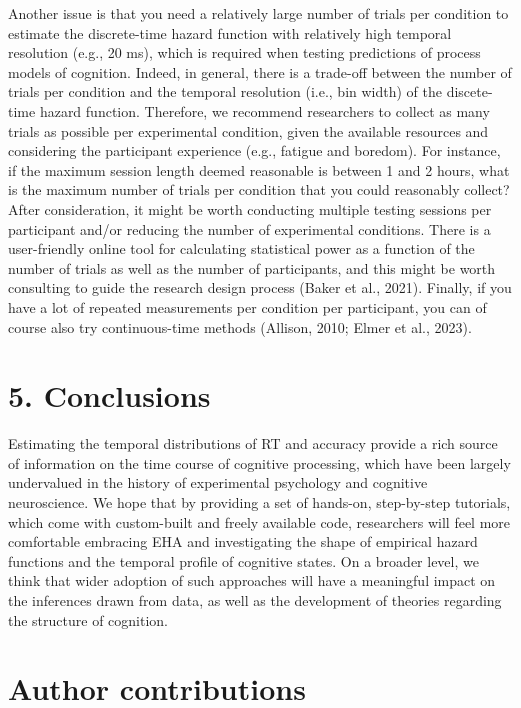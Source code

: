 \documentclass[
  man, donotrepeattitle,floatsintext]{apa6}
\begin{document}
Another issue is that you need a relatively large number of trials per condition to estimate the discrete-time hazard function with relatively high temporal resolution (e.g., 20 ms), which is required when testing predictions of process models of cognition. Indeed, in general, there is a trade-off between the number of trials per condition and the temporal resolution (i.e., bin width) of the discete-time hazard function. Therefore, we recommend researchers to collect as many trials as possible per experimental condition, given the available resources and considering the participant experience (e.g., fatigue and boredom). For instance, if the maximum session length deemed reasonable is between 1 and 2 hours, what is the maximum number of trials per condition that you could reasonably collect? After consideration, it might be worth conducting multiple testing sessions per participant and/or reducing the number of experimental conditions. There is a user-friendly online tool for calculating statistical power as a function of the number of trials as well as the number of participants, and this might be worth consulting to guide the research design process (Baker et al., 2021). Finally, if you have a lot of repeated measurements per condition per participant, you can of course also try continuous-time methods (Allison, 2010; Elmer et al., 2023).

\section{5. Conclusions}\label{conclusions}

Estimating the temporal distributions of RT and accuracy provide a rich source of information on the time course of cognitive processing, which have been largely undervalued in the history of experimental psychology and cognitive neuroscience. We hope that by providing a set of hands-on, step-by-step tutorials, which come with custom-built and freely available code, researchers will feel more comfortable embracing EHA and investigating the shape of empirical hazard functions and the temporal profile of cognitive states. On a broader level, we think that wider adoption of such approaches will have a meaningful impact on the inferences drawn from data, as well as the development of theories regarding the structure of cognition.

\newpage

\section{Author contributions}\label{author-contributions}
\end{document}
